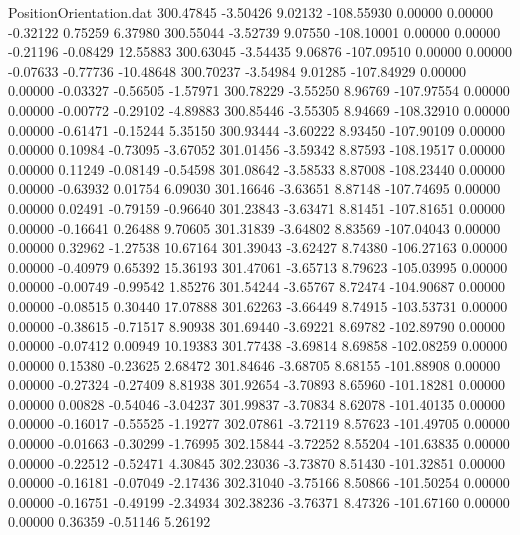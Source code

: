 \begin{filecontents}{PositionOrientation.dat}
 300.47845   -3.50426    9.02132  -108.55930    0.00000    0.00000   -0.32122    0.75259    6.37980
 300.55044   -3.52739    9.07550  -108.10001    0.00000    0.00000   -0.21196   -0.08429   12.55883
 300.63045   -3.54435    9.06876  -107.09510    0.00000    0.00000   -0.07633   -0.77736  -10.48648
 300.70237   -3.54984    9.01285  -107.84929    0.00000    0.00000   -0.03327   -0.56505   -1.57971
 300.78229   -3.55250    8.96769  -107.97554    0.00000    0.00000   -0.00772   -0.29102   -4.89883
 300.85446   -3.55305    8.94669  -108.32910    0.00000    0.00000   -0.61471   -0.15244    5.35150
 300.93444   -3.60222    8.93450  -107.90109    0.00000    0.00000    0.10984   -0.73095   -3.67052
 301.01456   -3.59342    8.87593  -108.19517    0.00000    0.00000    0.11249   -0.08149   -0.54598
 301.08642   -3.58533    8.87008  -108.23440    0.00000    0.00000   -0.63932    0.01754    6.09030
 301.16646   -3.63651    8.87148  -107.74695    0.00000    0.00000    0.02491   -0.79159   -0.96640
 301.23843   -3.63471    8.81451  -107.81651    0.00000    0.00000   -0.16641    0.26488    9.70605
 301.31839   -3.64802    8.83569  -107.04043    0.00000    0.00000    0.32962   -1.27538   10.67164
 301.39043   -3.62427    8.74380  -106.27163    0.00000    0.00000   -0.40979    0.65392   15.36193
 301.47061   -3.65713    8.79623  -105.03995    0.00000    0.00000   -0.00749   -0.99542    1.85276
 301.54244   -3.65767    8.72474  -104.90687    0.00000    0.00000   -0.08515    0.30440   17.07888
 301.62263   -3.66449    8.74915  -103.53731    0.00000    0.00000   -0.38615   -0.71517    8.90938
 301.69440   -3.69221    8.69782  -102.89790    0.00000    0.00000   -0.07412    0.00949   10.19383
 301.77438   -3.69814    8.69858  -102.08259    0.00000    0.00000    0.15380   -0.23625    2.68472
 301.84646   -3.68705    8.68155  -101.88908    0.00000    0.00000   -0.27324   -0.27409    8.81938
 301.92654   -3.70893    8.65960  -101.18281    0.00000    0.00000    0.00828   -0.54046   -3.04237
 301.99837   -3.70834    8.62078  -101.40135    0.00000    0.00000   -0.16017   -0.55525   -1.19277
 302.07861   -3.72119    8.57623  -101.49705    0.00000    0.00000   -0.01663   -0.30299   -1.76995
 302.15844   -3.72252    8.55204  -101.63835    0.00000    0.00000   -0.22512   -0.52471    4.30845
 302.23036   -3.73870    8.51430  -101.32851    0.00000    0.00000   -0.16181   -0.07049   -2.17436
 302.31040   -3.75166    8.50866  -101.50254    0.00000    0.00000   -0.16751   -0.49199   -2.34934
 302.38236   -3.76371    8.47326  -101.67160    0.00000    0.00000    0.36359   -0.51146    5.26192

\end{filecontents}
